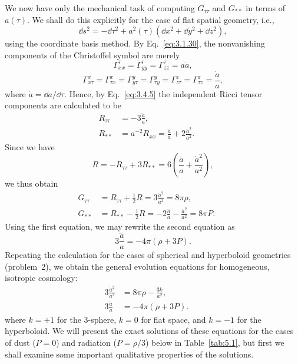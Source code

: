We now have only the mechanical task of computing \(G_{\tau\tau}\) and \(G_{**}\)
in terms of \(a(\tau)\). We shall do this explicitly for the case of flat spatial
geometry, i.e.,
\begin{equation}
  \dd s^2=-\dd\tau^2+a^2(\tau)(\dd x^2+\dd y^2+\dd z^2),
  \tag{5.2.5}\label{eq:5.2.5}
\end{equation}
using the coordinate basis method. By Eq.~\eqref{eq:3.1.30}, the nonvanishing
components of the Christoffel symbol are merely
\begin{equation}
  \Gamma^\tau_{xx}=\Gamma^\tau_{yy}=\Gamma^\tau_{zz}=a\dot a,
  \tag{5.2.6}\label{eq:5.2.6}
\end{equation}
\begin{equation}
  \Gamma^x_{x\tau}=\Gamma^x_{\tau x}=\Gamma^y_{y\tau}=\Gamma^y_{\tau y}
  =\Gamma^z_{z\tau}=\Gamma^z_{\tau z}=\frac{\dot a}{a},
  \tag{5.2.7}\label{eq:5.2.7}
\end{equation}
where \(\dot a=\dd a/\dd\tau\). Hence, by Eq.~\eqref{eq:3.4.5} the independent Ricci
tensor components are calculated to be
\begin{align}
  R_{\tau\tau}&=-3\frac{\ddot a}{a}, &&\tag{5.2.8}\label{eq:5.2.8}\\
  R_{**}&=a^{-2}R_{xx}=\frac{\ddot a}{a}+2\frac{\dot a^2}{a^2}. &&\tag{5.2.9}\label{eq:5.2.9}
\end{align}
Since we have
\begin{equation}
  R=-R_{\tau\tau}+3R_{**}=6\left(\frac{\ddot a}{a}+\frac{\dot a^2}{a^2}\right),
  \tag{5.2.10}\label{eq:5.2.10}
\end{equation}
we thus obtain
\begin{align}
  G_{\tau\tau}&=R_{\tau\tau}+\tfrac12R=3\frac{\dot a^2}{a^2}=8\pi\rho,
    &&\tag{5.2.11}\label{eq:5.2.11}\\
  G_{**}&=R_{**}-\tfrac12R=-2\frac{\ddot a}{a}-\frac{\dot a^2}{a^2}=8\pi P.
    &&\tag{5.2.12}\label{eq:5.2.12}
\end{align}
Using the first equation, we may rewrite the second equation as
\begin{equation}
  3\frac{\ddot a}{a}=-4\pi(\rho+3P).
  \tag{5.2.13}\label{eq:5.2.13}
\end{equation}
Repeating the calculation for the cases of spherical and hyperboloid geometries
(problem~2), we obtain the general evolution equations for homogeneous, isotropic
cosmology:
\begin{align}
  3\frac{\dot a^2}{a^2}&=8\pi\rho-\frac{3k}{a^2}, &&\tag{5.2.14}\label{eq:5.2.14}\\
  3\frac{\ddot a}{a}&=-4\pi(\rho+3P). &&\tag{5.2.15}\label{eq:5.2.15}
\end{align}
where \(k=+1\) for the 3-sphere, \(k=0\) for flat space, and \(k=-1\) for the
hyperboloid. We will present the exact solutions of these equations for the cases of
dust (\(P=0\)) and radiation (\(P=\rho/3\)) below in Table~\ref{tab:5.1}, but first
we shall examine some important qualitative properties of the solutions.

